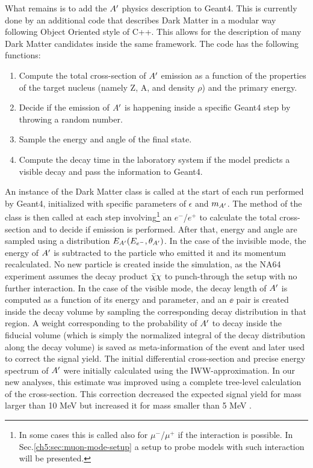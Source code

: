 What remains is to add the $A'$ physics description to Geant4. This is currently done by an additional code that describes Dark Matter in a modular way following Object Oriented style of C++. This allows for the description of many Dark Matter candidates inside the same framework. The code has the following functions:

\begin{enumerate}
\item Compute the total cross-section of $A'$ emission as a function of the properties of the target nucleus (namely Z, A, and density $\rho$) and the primary energy.
\item Decide if the emission of $A'$ is happening inside a specific Geant4 step by throwing a random number.
\item Sample the energy and angle of the final state.
\item Compute the decay time in the laboratory system if the model predicts a visible decay and pass the information to Geant4.
\end{enumerate}

An instance of the Dark Matter class is called at the start of each run performed by Geant4, initialized with specific parameters of $\epsilon$ and $m_{A'}$. The method of the class is then called at each step involving\footnote{In some cases this is called also for $\mu^-$/$\mu^+$ if the interaction is possible. In Sec.\ref{ch5:sec:muon-mode-setup} a setup to probe models with such interaction will be presented.} an $e^-$/$e^+$ to calculate the total cross-section and to decide if emission is performed. After that, energy and angle are sampled using a distribution $E_{A'}(E_{e^-}, \theta_{A'})$. In the case of the invisible mode, the energy of $A'$ is subtracted to the particle who emitted it and its momentum recalculated. No new particle is created inside the simulation, as the NA64 experiment assumes the decay product $\bar{\chi} \chi$ to punch-through the setup with no further interaction. In the case of the visible mode, the decay length of $A'$ is computed as a function of its energy and parameter, and an $\ee$ pair is created inside the decay volume by sampling the corresponding decay distribution in that region. A weight corresponding to the probability of $A'$ to decay inside the fiducial volume (which is simply the normalized integral of the decay distribution along the decay volume) is saved as meta-information of the event and later used to correct the signal yield.
The initial differential cross-section and precise energy spectrum of $A'$ were initially calculated using the IWW-approximation. In our new analyses, this estimate was improved using a complete tree-level calculation of the cross-section. This correction decreased the expected signal yield for mass larger than 10 MeV but increased it for mass smaller than 5 MeV \cite{DMsimulation}.

